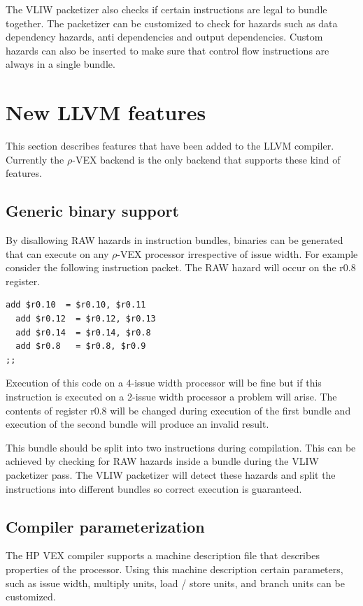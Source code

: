 The VLIW packetizer also checks if certain instructions are legal to bundle together. The packetizer can be customized to check for hazards such as data dependency hazards, anti dependencies and output dependencies. Custom hazards can also be inserted to make sure that control flow instructions are always in a single bundle.

\section{New LLVM features}
This section describes features that have been added to the LLVM compiler. Currently the $\rho$-VEX backend is the only backend that supports these kind of features.

\subsection{Generic binary support}
By disallowing RAW hazards in instruction bundles, binaries can be generated that can execute on any $\rho$-VEX processor irrespective of issue width. For example consider the following instruction packet. The RAW hazard will occur on the r0.8 register.

\begin{lstlisting}[language=rvex]
  add $r0.10  = $r0.10, $r0.11
  add $r0.12  = $r0.12, $r0.13
  add $r0.14  = $r0.14, $r0.8
  add $r0.8   = $r0.8, $r0.9
;; 
\end{lstlisting}

Execution of this code on a 4-issue width processor will be fine but if this instruction is executed on a 2-issue width processor a problem will arise. The contents of register r0.8 will be changed during execution of the first bundle and execution of the second bundle will produce an invalid result.

This bundle should be split into two instructions during compilation. This can be achieved by checking for RAW hazards inside a bundle during the VLIW packetizer pass. The VLIW packetizer will detect these hazards and split the instructions into different bundles so correct execution is guaranteed.

\subsection{Compiler parameterization}
The HP VEX compiler supports a machine description file that describes properties of the processor. Using this machine description certain parameters, such as issue width, multiply units, load / store units, and branch units can be customized. 

